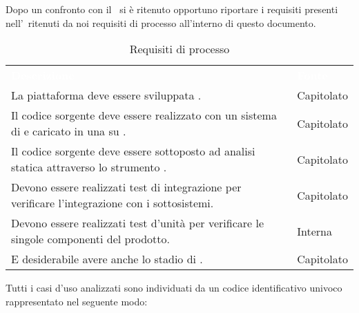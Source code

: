 \label{RequisitiProcesso}Dopo un confronto con il \VT\ si è ritenuto opportuno riportare i requisiti presenti nell'\AdR\ ritenuti da noi requisiti di processo all'interno di questo documento.\\
\begin{table}[h]
	\centering
	\caption{Requisiti di processo} 
\renewcommand{\arraystretch}{1.5}
\begin{tabular}{|C{9.5cm} C{2.5cm}|} 
	
	\textcolor{white}{\textbf{Descrizione}}&
	\textcolor{white}{\textbf{Fonte}}\\	

	La piattaforma deve essere sviluppata . & Capitolato\\
	Il codice sorgente deve essere realizzato con un sistema di  e caricato in una  su . & Capitolato\\
	Il codice sorgente deve essere sottoposto ad analisi statica attraverso lo strumento . & Capitolato\\
	Devono essere realizzati test di integrazione per verificare l’integrazione con i sottosistemi. & Capitolato\\
	Devono essere realizzati test d’unità per verificare le singole componenti del prodotto. & Interna\\
	E desiderabile avere anche lo stadio di . & Capitolato\\
	\hline
\end{tabular}
\end{table}

Tutti i casi d'uso analizzati sono individuati da un codice identificativo univoco rappresentato nel seguente modo:

